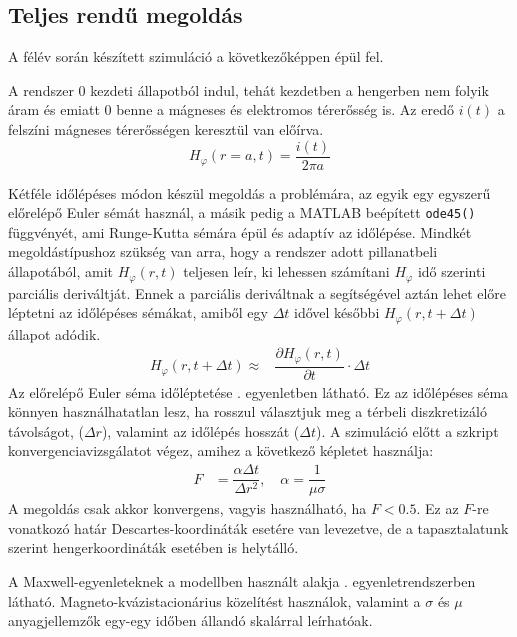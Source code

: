         \subsection{Teljes rendű megoldás}
            A félév során készített szimuláció a következőképpen épül fel.
            \par
            A rendszer 0 kezdeti állapotból indul, tehát kezdetben a hengerben nem folyik áram és emiatt 0 benne a mágneses és elektromos térerősség is. Az eredő $i(t)$ a felszíni mágneses térerősségen keresztül van előírva.
            \begin{equation}
                H_{\varphi}(r=a,t) = \dfrac{i(t)}{2\pi a}
            \end{equation}
            \par
            Kétféle időlépéses módon készül megoldás a problémára, az egyik egy egyszerű előrelépő Euler sémát használ, a másik pedig a MATLAB beépített \verb|ode45()| függvényét, ami Runge-Kutta sémára épül és adaptív az időlépése. Mindkét megoldástípushoz szükség van arra, hogy a rendszer adott pillanatbeli állapotából, amit $H_{\varphi}(r,t)$ teljesen leír, ki lehessen számítani $H_{\varphi}$ idő szerinti parciális deriváltját. Ennek a parciális deriváltnak a segítségével aztán lehet előre léptetni az időlépéses sémákat, amiből egy $\Delta t$ idővel későbbi $H_{\varphi}(r,t+\Delta t)$ állapot adódik.
            \begin{align}
                \label{equ:fe}
                H_{\varphi}(r,t+\Delta t) \approx & \dfrac{\partial H_{\varphi}(r,t)}{\partial t} \cdot \Delta t
            \end{align}
            Az előrelépő Euler séma időléptetése . egyenletben látható. Ez az időlépéses séma könnyen használhatatlan lesz, ha rosszul választjuk meg a térbeli diszkretizáló távolságot, ($\Delta r$), valamint az időlépés hosszát ($\Delta t$). A szimuláció előtt a szkript konvergenciavizsgálatot végez, amihez a következő képletet használja:
            \begin{align}
                F &= \dfrac{\alpha \Delta t}{\Delta r^2}, \quad \alpha = \dfrac{1}{\mu \sigma}
            \end{align}
            A megoldás csak akkor konvergens, vagyis használható, ha $F<0.5$. Ez az $F$-re vonatkozó határ Descartes-koordináták esetére van levezetve, de a tapasztalatunk szerint hengerkoordináták esetében is helytálló.
            \par
            A Maxwell-egyenleteknek a modellben használt alakja . egyenletrendszerben látható. Magneto-kvázistacionárius közelítést használok, valamint a $\sigma$ és $\mu$ anyagjellemzők egy-egy időben állandó skalárral leírhatóak.
